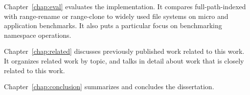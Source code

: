 Chapter~\ref{chap:eval} evaluates the implementation.
It compares full-path-indexed \betrfs with range-rename or range-clone to
widely used file systems on micro and application benchmarks.
It also puts a particular focus on benchmarking namespace operations.

Chapter~\ref{chap:related} discusses previously published work related to
this work.
It organizes related work by topic, and talks in detail about work that is
closely related to this work.

Chapter~\ref{chap:conclusion} summarizes and concludes the dissertation.

